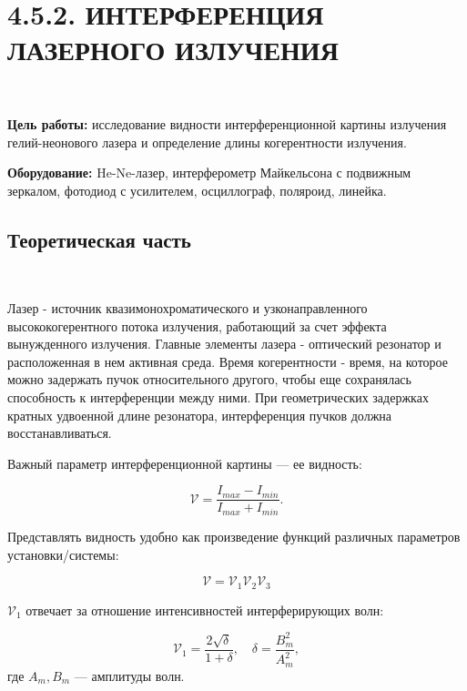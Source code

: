 \documentclass[12pt]{article}
\begin{document}
    \section*{4.5.2. ИНТЕРФЕРЕНЦИЯ ЛАЗЕРНОГО ИЗЛУЧЕНИЯ}
    \ \par
    \textbf{Цель работы:} исследование видности интерференционной картины излучения
    гелий-неонового лазера и определение длины когерентности излучения. \par
    \textbf{Оборудование:} He-Ne-лазер, интерферометр Майкельсона с подвижным зеркалом,
    фотодиод с усилителем, осциллограф, поляроид, линейка.

    \subsection*{Теоретическая часть}
    \ \par
    Лазер - источник квазимонохроматического и узконаправленного высококогерентного потока излучения,
    работающий за счет эффекта вынужденного излучения.
    Главные элементы лазера - оптический резонатор и расположенная в нем активная среда.
    Время когерентности - время, на которое можно задержать пучок относительного другого,
    чтобы еще сохранялась способность к интерференции между ними.
    При геометрических задержках кратных удвоенной длине резонатора,
    интерференция пучков должна восстанавливаться.

    Важный параметр интерференционной картины --- ее видность:

    \begin{equation}
        \label{eq:eq1}
        \mathcal{\mathcal{V}} = \dfrac{I_{max} - I_{min}}{I_{max} + I_{min}}.
    \end{equation}

    Представлять видность удобно как произведение функций различных параметров установки/системы:

    \begin{equation}
        \label{eq:eq2}
        \mathcal{V} = \mathcal{V}_1 \mathcal{V}_2 \mathcal{V}_3
    \end{equation}

    $\mathcal{V}_1$ отвечает за отношение интенсивностей интерферирующих волн:

    \begin{equation}
        \label{eq:eq3}
        \mathcal{V}_1 = \dfrac{2\sqrt{\delta}}{1 + \delta}, \quad \delta = \dfrac{B_m^2}{A_m^2},
    \end{equation}
    где $ A_m, B_m $ --- амплитуды волн.
\end{document}
